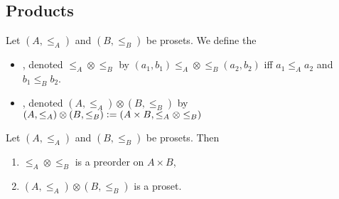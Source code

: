 \documentclass{book}
\begin{document}
	
	
	
	
	
	
	
	
	
	
	
	
	
	
	
	
	
	
	
	
	
	
	
	
	
	
	
	
	
	
	
	
	
	
	
	
	
	
	
	
	
	
	
	
	
	
	
	
	
	
	\subsection{Products}
	
	\begin{defn} 
		Let $(A, \leq_A)$ and $(B, \leq_B)$ be prosets. We define the 
		\begin{itemize}
			\item {}, denoted $\leq_A \otimes \leq_B$ by $(a_1,b_1) \leq_A \otimes \leq_B (a_2, b_2)$ iff $a_1 \leq_A a_2$ and $b_1 \leq_B b_2$.
			\item {}, denoted $(A, \leq_A) \otimes (B, \leq_B)$ by $(A, \leq_A) \otimes (B, \leq_B) \vcentcolon= (A \times B, \leq_A \otimes \leq_B)$
		\end{itemize}
	\end{defn}
	
	\begin{ex} 
		Let $(A, \leq_A)$ and $(B, \leq_B)$ be prosets. Then 
		\begin{enumerate}
			\item $\leq_A \otimes \leq_B$ is a preorder on $A \times B$,
			\item $(A, \leq_A) \otimes (B, \leq_B)$ is a proset.
		\end{enumerate}
	\end{ex}
	
\end{document}
